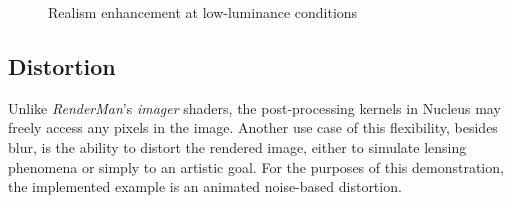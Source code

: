 \begin{figure}[ht!]
  \centering
  \caption[Scotopic vision]{Realism enhancement at low-luminance conditions}
  \label{fig:postProcAcuityComparison}
\end{figure}

\subsection{Distortion}

Unlike \emph{RenderMan}'s \emph{imager} shaders, the post-processing kernels in Nucleus may freely access any pixels in the image. Another use case of this flexibility, besides blur, is the ability to distort the rendered image, either to simulate lensing phenomena or simply to an artistic goal. For the purposes of this demonstration, the implemented example is an animated noise-based distortion.

